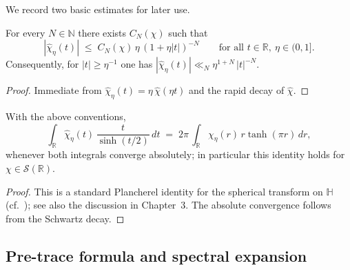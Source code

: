 We record two basic estimates for later use.

\begin{lemma} \label{lem:7.1-Schwartz}
For every $N\in\mathbb{N}$ there exists $C_N(\chi)$ such that
\[
  |\widehat{\chi}_\eta(t)| \;\le\; C_N(\chi)\,\eta\,(1+ \eta |t|)^{-N}
  \qquad\text{for all } t\in\mathbb{R},\ \eta\in (0,1].
\]
Consequently, for $|t|\ge \eta^{-1}$ one has $|\widehat{\chi}_\eta(t)|\ll_N \eta^{1+N}\,|t|^{-N}$.
\end{lemma}

\begin{proof}
Immediate from $\widehat{\chi}_\eta(t)=\eta\,\widehat{\chi}(\eta t)$ and the rapid decay of $\widehat{\chi}$.
\end{proof}

\begin{lemma} \label{lem:7.1-FourierNorm}
With the above conventions,
\[
  \int_{\mathbb{R}} \widehat{\chi}_\eta(t)\, \frac{t}{\sinh(t/2)}\, dt
  \;=\; 2\pi\, \int_{\mathbb{R}} \chi_\eta(r)\, r \tanh(\pi r)\, dr,
\]
whenever both integrals converge absolutely; in particular this identity holds for $\chi\in \mathcal{S}(\mathbb{R})$.
\end{lemma}

\begin{proof}
This is a standard Plancherel identity for the spherical transform on $\mathbb{H}$ (cf.\ \cite[Ch.~3]{Iwaniec2002}); see also the discussion in Chapter~3. The absolute convergence follows from the Schwartz decay.
\end{proof}

\subsection{Pre-trace formula and spectral expansion} \label{subsec:7.1-pretrace}

